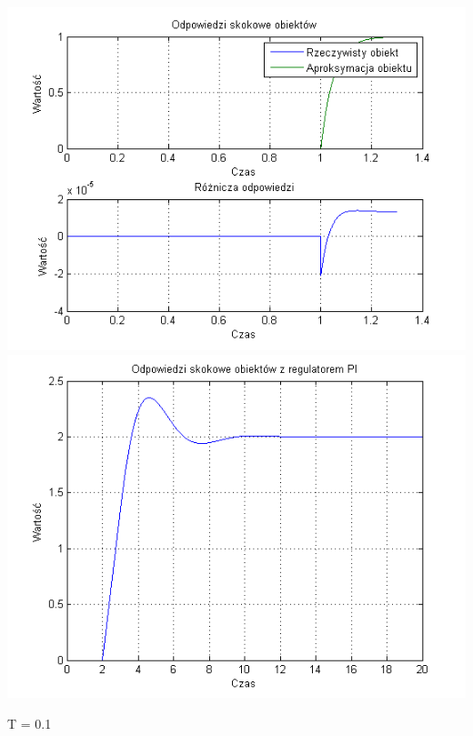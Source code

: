 \documentclass[10pt,a4paper]{article}
\begin{document}
\begin{center}
\includegraphics[scale=1]{images/jeden/skrypt_03.png}\\
\includegraphics[scale=1]{images/jeden/skrypt_04.png}\\
\end{center}
\newpage
T = 0.1
\end{document}
